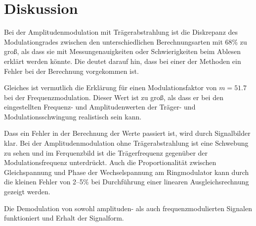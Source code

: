 \section{Diskussion}

Bei der Amplitudenmodulation mit Trägerabstrahlung ist die Diskrepanz des Modulationgrades zwischen den unterschiedlichen Berechnungsarten mit 68\% zu groß, als dass sie mit Messungenauigkeiten oder Schwierigkeiten beim Ablesen erklärt werden könnte. Die deutet darauf hin, dass bei einer der Methoden ein Fehler bei der Berechnung vorgekommen ist. 

Gleiches ist vermutlich die Erklärung für einen Modulationsfaktor von $m = 51.7$ bei der Frequenzmodulation. Dieser Wert ist zu groß, als dass er bei den eingestellten Frequenz- und Amplitudenwerten der Träger- und Modulationsschwingung realistisch sein kann.

Dass ein Fehler in der Berechnung der Werte passiert ist, wird durch Signalbilder klar. Bei der Amplitudenmodulation ohne Trägerabstrahlung ist eine Schwebung zu sehen und im Ferquenzbild ist die Trägerfrequenz gegenüber der Modulationsfrequenz unterdrückt. Auch die Proportionalität zwischen Gleichspannung und Phase der Wechselspannung am Ringmodulator kann durch die kleinen Fehler von 2--5\% bei Durchführung einer linearen Ausgleichsrechnung gezeigt werden.

Die Demodulation von sowohl amplituden- als auch frequenzmodulierten Signalen funktioniert und Erhalt der Signalform.

\printbibliography
